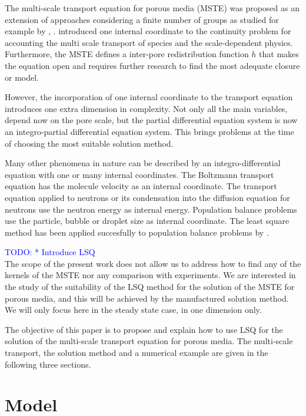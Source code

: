 \documentclass{CFD2011}
\newcommand{\TODO}[1]{\textcolor{blue}{TODO: #1} \\}
\begin{document}
The multi-scale transport equation for porous media (MSTE) was proposed as an extension of approaches considering a finite number of groups as studied for example by \cite{Chen1989}, \cite{bouffard2001}. \cite{DupuySchwarz} introduced one internal coordinate to the continuity problem for accounting the multi scale transport of species and the scale-dependent physics. Furthermore, the MSTE defines a inter-pore redistribution function $h$ that makes the equation open and requires further research to find the most adequate closure or model.

However, the incorporation of one internal coordinate to the transport equation introduces one extra dimension in complexity. Not only all the main variables, depend now on the pore scale, but the partial differential equation system is now an integro-partial differential equation system. This brings problems at the time of choosing the most suitable solution method. 

Many other phenomena in nature can be described by an integro-differential equation with one or many internal coordinates. The Boltzmann transport equation has the molecule velocity as an internal coordinate. The transport equation applied to neutrons or its condensation into the diffusion equation for neutrons use the neutron energy as internal energy. Population balance problems use the particle, bubble or droplet size as internal coordinate. The least square method has been applied succesfully to population balance problems by \cite{Dorao05a}.

\TODO{     * Introduce LSQ}


The scope of the present work does not allow us to address how to find any of the kernels of the MSTE nor any comparison with experiments. We are interested in the study of the suitability of the LSQ method for the solution of the MSTE for porous media, and this will be achieved by the manufactured solution method. We will only focus here in the steady state case, in one dimension only.

The objective of this paper is to propose and explain how to use LSQ for the solution of the multi-scale transport equation for porous media. The multi-scale transport, the solution method and a numerical example are given in the following three sections.

\section{Model}
\end{document}
